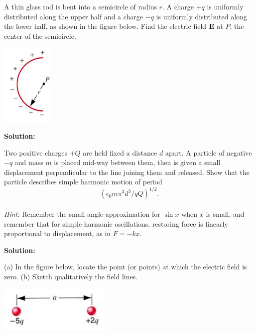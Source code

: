 \documentclass[11pt]{article}
\newcommand{\pn}[1]{\left( #1 \right)}
\begin{document}
\clearpage

\begin{problem}[(E26.16)]
A thin glass rod is bent into a semicircle of radius $r$. A charge $+q$ is uniformly distributed along the upper half and a charge $-q$ is uniformly
distributed along the lower half, as shown in the figure below. Find the electric field $\mathbf{E}$ at $P$, the center of the semicircle.
\begin{center}
\includegraphics[scale=0.75]{prob3.png}
\end{center}
\end{problem}


\textbf{Solution:}


\clearpage

\begin{problem}[(P25.8)]
Two positive charges $+Q$ are held fixed a distance $d$ apart. A particle of negative $-q$ and mass $m$ is placed mid-way between them, 
then is given a small displacement perpendicular to the line joining them and released. Show that the particle describes simple harmonic motion of period
$$\pn{\epsilon_0m\pi^3d^3/qQ}^{1/2}.$$\\
\textit{Hint:} Remember the small angle approximation for $\sin x$ when $x$ is small, and remember that for simple harmonic oscillations, restoring force is linearly
proportional to displacement, as in $F = -kx$.
\end{problem}


\textbf{Solution:}


\clearpage

\begin{problem}[(E26.24)]
(a) In the figure below, locate the point (or points) at which the electric field is zero. (b) Sketch qualitatively the field lines.
\begin{center}
\includegraphics[scale=0.8]{prob5.png}
\end{center}
\end{problem}
\end{document}
